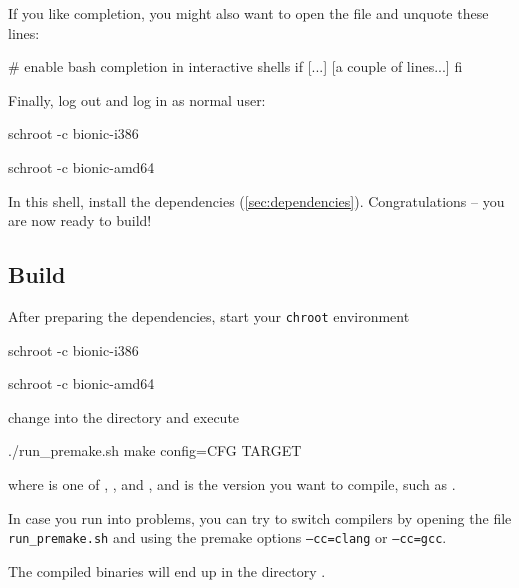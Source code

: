If you like  completion, you might also want to open the
file  and unquote these lines:

\begin{VerbatimBoth}
  # enable bash completion in interactive shells
  if [...]
    [a couple of lines...]
  fi
\end{VerbatimBoth}

Finally, log out and log in as normal user:

\begin{Verbatim32}
  schroot -c bionic-i386
\end{Verbatim32}

\begin{Verbatim64}
  schroot -c bionic-amd64
\end{Verbatim64}

In this  shell, install the dependencies
(\ref{sec:dependencies}).  Congratulations -- you are now ready to
build!

\subsection{Build}

After preparing the dependencies, start your \texttt{chroot}
environment

\begin{Verbatim32}
  schroot -c bionic-i386
\end{Verbatim32}

\begin{Verbatim64}
  schroot -c bionic-amd64
\end{Verbatim64}

change into the directory  and execute

\begin{VerbatimBoth}
  ./run_premake.sh
  make config=CFG TARGET
\end{VerbatimBoth}

where  is one of ,
,  and
, and  is the version
you want to compile, such as .

In case you run into problems, you can try to switch compilers by
opening the file \texttt{run\_premake.sh} and using the premake
options \texttt{--cc=clang} or \texttt{--cc=gcc}.

The compiled binaries will end up in the directory .

